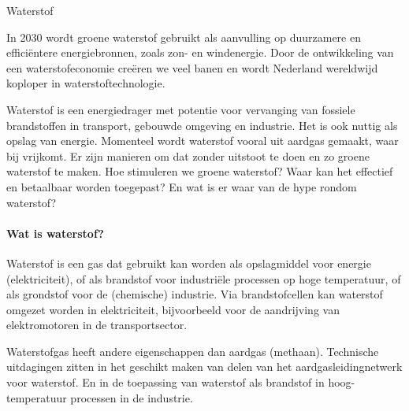 \begin{voorstel}{Waterstof}


\begin{samenvatting}
In 2030 wordt groene waterstof gebruikt als aanvulling op duurzamere en efficiëntere energiebronnen, zoals zon- en windenergie. Door de ontwikkeling van een waterstofeconomie creëren we veel banen en wordt Nederland wereldwijd koploper in waterstoftechnologie.
\end{samenvatting}

\begin{multicols*}{2}

\begin{uitdaging}
Waterstof is een energiedrager met potentie voor vervanging van fossiele brandstoffen in transport, gebouwde omgeving en industrie. Het is ook nuttig als opslag van energie. Momenteel wordt waterstof vooral uit aardgas gemaakt, waar \COO bij vrijkomt. Er zijn manieren om dat zonder uitstoot te doen en zo groene waterstof te maken. Hoe stimuleren we groene waterstof? Waar kan het effectief en betaalbaar worden toegepast? En wat is er waar van de hype rondom waterstof?
\end{uitdaging}

\begin{overwegingen}


\paragraph{Wat is waterstof?}
Waterstof is een gas dat gebruikt kan worden als opslagmiddel voor energie (elektriciteit), of als brandstof voor industriële processen op hoge temperatuur, of als grondstof voor de (chemische) industrie. Via brandstofcellen kan waterstof omgezet worden in elektriciteit, bijvoorbeeld voor de aandrijving van elektromotoren in de transportsector.

Waterstofgas heeft andere eigenschappen dan aardgas (methaan). Technische uitdagingen zitten in het geschikt maken van delen van het aardgasleidingnetwerk voor waterstof. En in de toepassing van waterstof als brandstof in hoog-temperatuur processen in de industrie.


\end{overwegingen}
\end{multicols*}
\end{voorstel}
